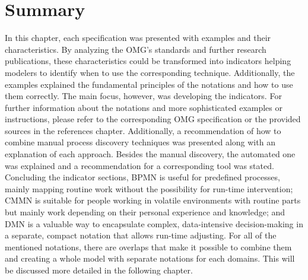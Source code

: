 \section{Summary}
In this chapter, each specification was presented with examples and their characteristics. By analyzing the OMG's standards and further research publications, these characteristics could be transformed into indicators helping modelers to identify when to use the corresponding technique. Additionally, the examples explained the fundamental principles of the notations and how to use them correctly. The main focus, however, was developing the indicators. For further information about the notations and more sophisticated examples or instructions, please refer to the corresponding OMG specification or the provided sources in the references chapter. 
Additionally, a recommendation of how to combine manual process discovery techniques was presented along with an explanation of each approach. Besides the manual discovery, the automated one was explained and a recommendation for a corresponding tool was stated. 
Concluding the indicator sections, BPMN is useful for predefined processes, mainly mapping routine work without the possibility for run-time intervention; CMMN is suitable for people working in volatile environments with routine parts but mainly work depending on their personal experience and knowledge; and DMN is a valuable way to encapsulate complex, data-intensive decision-making in a separate, compact notation that allows run-time adjusting. For all of the mentioned notations, there are overlaps that make it possible to combine them and creating a whole model with separate notations for each domains. This will be discussed more detailed in the following chapter.

\listoftodos

